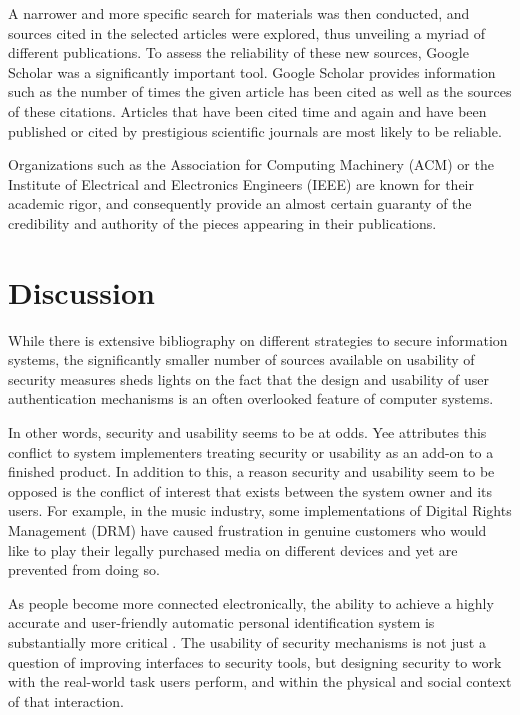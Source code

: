 \documentclass{article}
\begin{document}
A narrower and more specific search for materials was then conducted, and sources cited in the selected articles were explored, thus unveiling a myriad of different publications. To assess the reliability of these new sources, Google Scholar was a significantly important tool. Google Scholar provides information such as the number of times the given article has been cited as well as the sources of these citations.  Articles that have been cited time and again and have been published or cited by prestigious scientific journals are most likely to be reliable.

Organizations such as the Association for Computing Machinery (ACM) or the Institute of Electrical and Electronics Engineers (IEEE) are known for their academic rigor, and consequently provide an almost certain guaranty of the credibility and authority of the pieces appearing in their publications. 


\section{Discussion}
While there is extensive bibliography on different strategies to secure information systems, the significantly smaller number of sources available on usability of security measures sheds lights on the fact that the design and usability of user authentication mechanisms is an often overlooked feature of computer systems.

In other words, security and usability seems to be at odds. Yee \cite{yee2004aligning} attributes this conflict to system implementers treating security or usability as an add-on to a finished product. In addition to this, a reason security and usability seem to be opposed is the conflict of interest that exists between the system owner and its users. For example, in the music industry, some implementations of Digital Rights Management (DRM) have caused frustration in genuine customers who would like to play their legally purchased media on different devices and yet are prevented from doing so. 

As people become more connected electronically, the ability to achieve a highly accurate and user-friendly automatic personal identification system is substantially more critical \cite{jain2000biometric}. The usability of security mechanisms is not just a question of improving interfaces to security tools, but designing security to work with the real-world task users perform, and within the physical and social context of that interaction. 
\end{document}
